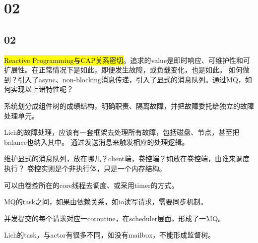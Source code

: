 \section{02}

\subsection{02}

\hl{Reactive Programming与CAP关系密切}。追求的value是即时响应、可维护性和可扩展性。在正常情况下是如此，即便发生故障，或负载变化，也是如此。
如何做到？引入了async、non-blocking消息传递，引入了显式的消息队列。通过MQ，如何实现以上诸特性呢？

系统划分成组件树的成绩结构，明确职责、隔离故障，并把故障委托给独立的故障处理单元。

\hrulefill

Lich的故障处理，应该有一套框架去处理所有故障，包括磁盘、节点，甚至把balance也纳入其中。
通过发送消息来触发相应的处理逻辑。

维护显式的消息队列，放在哪儿？client端，卷控端？如放在卷控端，由谁来调度执行？
卷控实则是个非执行体，只是一个内存结构。

可以由卷控所在的core线程去调度、或采用timer的方式。

MQ的task之间，如果由依赖关系，如io读写请求，需要同步机制。

并发提交的每个请求对应一coroutine，在scheduler层面，形成了一MQ。

\hrulefill

Lich的task，与actor有很多不同，如没有mailbox，不能形成监督树。
